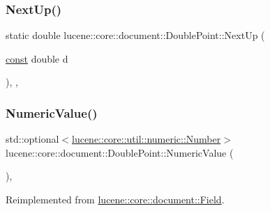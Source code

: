 \subsubsection{\texorpdfstring{Next\+Up()}{NextUp()}}
{\footnotesize\ttfamily static double lucene\+::core\+::document\+::\+Double\+Point\+::\+Next\+Up (\begin{DoxyParamCaption}\item[{\mbox{\hyperlink{ZlibCrc32_8h_a2c212835823e3c54a8ab6d95c652660e}{const}} double}]{d }\end{DoxyParamCaption})\hspace{0.3cm}{\ttfamily [inline]}, {\ttfamily [static]}, {\ttfamily [noexcept]}}

\mbox{\label{classlucene_1_1core_1_1document_1_1DoublePoint_aff495d94ea271af89212706b21aa3196}} 
\subsubsection{\texorpdfstring{Numeric\+Value()}{NumericValue()}}
{\footnotesize\ttfamily std\+::optional$<$\mbox{\hyperlink{classlucene_1_1core_1_1util_1_1numeric_1_1Number}{lucene\+::core\+::util\+::numeric\+::\+Number}}$>$ lucene\+::core\+::document\+::\+Double\+Point\+::\+Numeric\+Value (\begin{DoxyParamCaption}{ }\end{DoxyParamCaption})\hspace{0.3cm}{\ttfamily [inline]}, {\ttfamily [virtual]}}



Reimplemented from \mbox{\hyperlink{classlucene_1_1core_1_1document_1_1Field_a858814043215c98bacf6ecc823d078ea}{lucene\+::core\+::document\+::\+Field}}.

\mbox{\label{classlucene_1_1core_1_1document_1_1DoublePoint_a9ad090bc4fec578601b40f974302f60f}} 

